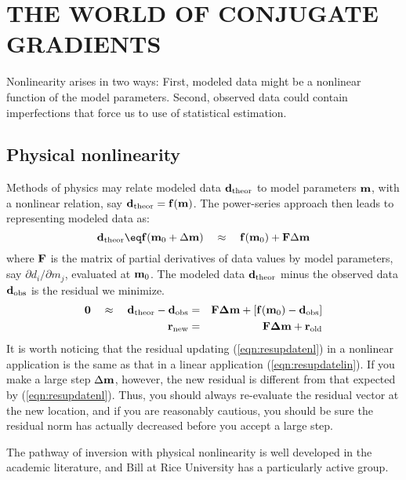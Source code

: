 
\section{THE WORLD OF CONJUGATE GRADIENTS}

Nonlinearity arises in two ways:
First, modeled data might be a nonlinear function of the model parameters.
Second, observed data could contain imperfections that force us to use
 of statistical estimation.

\subsection{Physical nonlinearity}
Methods of physics may
relate modeled data $\bold d_{\rm theor}$ to model parameters $\bold m$,
with a nonlinear relation,
say $\bold d_{\rm theor} =\bold f(\bold m)$.
The power-series approach then leads to
representing modeled data as:
\begin{equation}
\bold d_{\rm theor} \eq
  \bold f(\bold m_0 + \Delta \bold m)
  \quad\approx\quad
  \bold f\bold (\bold m_0) + \bold F\Delta \bold m
\end{equation}
where $\bold F$ is the matrix of partial derivatives
of data values by model parameters,
say $\partial d_i/\partial m_j$,
evaluated at $\bold m_0$.
The modeled data  $\bold d_{\rm theor}$ minus
the observed data $\bold d_{\rm obs}$ is the residual we minimize.
\begin{eqnarray}
\bold 0 \quad\approx\quad
 \bold d_{\rm theor} - \bold d_{\rm obs}
 &=& \bold F\bold \Delta\bold  m +[\bold f(\bold m_0) - \bold d_{\rm obs}] \\
\bold r_{\rm new}
 &=& \bold F\bold \Delta\bold  m + \bold r_{\rm old}
\label{eqn:resupdatenl}
\end{eqnarray}
It is worth noticing that the residual updating
(\ref{eqn:resupdatenl})
in a nonlinear application is the same
as that in a linear application (\ref{eqn:resupdatelin}).
If you make a large step $\Delta \bold m$, however,
the new residual
is different from that expected by
(\ref{eqn:resupdatenl}).
Thus, 
you should always re-evaluate the residual vector at the new location,
and if you are reasonably cautious,
you should be sure the residual norm has actually decreased
before you accept a large step.

\par
The pathway of inversion with physical nonlinearity
is well developed in the academic literature,
and Bill  at Rice University has a particularly active group.

